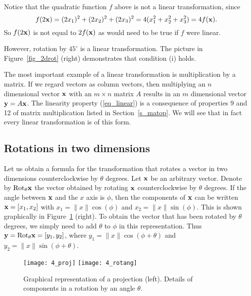 Notice that the quadratic function $f$ above is not a linear transformation,
since 
\[
f(2{\bf x}) = (2x_1)^2+(2x_2)^2+(2x_3)^2 = 4(x_1^2+x_2^2+x_3^2)=4f({\bf x}).
\]
So $f(2{\bf x})$ is not equal to $2f({\bf x})$ as would need to be true if $f$
were linear.

However, rotation by $45^\circ$ is a linear transformation. The
picture in Figure~\ref{fig_2drot} (right) demonstrates that condition
(i) holds.

The most important example of a linear transformation is multiplication by a
matrix. If we regard vectors as column vectors, then multiplying an $n$
dimensional vector ${\bf x}$ with an $m\times n$ matrix $A$ results in an $m$
dimensional vector ${\bf y}=A{\bf x}$. The linearity property (\ref{eq_linear}) is a
consequence of properties 9 and 12 of matrix multiplication listed in 
Section~\ref{s_matop}. We will see
that in fact every linear transformation is of this form.

\subsection{Rotations in two dimensions}

Let us obtain a formula for the transformation that rotates a vector
in two dimensions counterclockwise by $\theta$ degrees. Let ${\bf x}$ be
an arbitrary vector. Denote by ${\rm Rot}_\theta{\bf x}$ the vector
obtained by rotating ${\bf x}$ counterclockwise by $\theta$ degrees.  If
the angle between ${\bf x}$ and the $x$ axis is $\phi$, then the
components of ${\bf x}$ can be written ${\bf x}=[x_1,x_2]$ with
$x_1=\|x\|\cos(\phi)$ and $x_2= \|x\|\sin(\phi)$. This is shown
graphically in Figure~\ref{fig_proj1} (right). To obtain the vector
that has been rotated by $\theta$ degrees, we simply need to add
$\theta$ to $\phi$ in this representation. Thus ${\bf y}={\rm Rot}_\theta
{\bf x} = [y_1,y_2]$, where $y_1 = \|x\|\cos(\phi+\theta)$ and $y_2=
\|x\|\sin(\phi+\theta)$.

\begin{figure}
\label{fig_proj1}
\centerline{\texttt{[image: 4\_proj]}
\texttt{[image: 4\_rotang]}}
\caption{Graphical representation of a projection (left). Details of
components in a rotation by an angle $\theta$.}
\end{figure}

